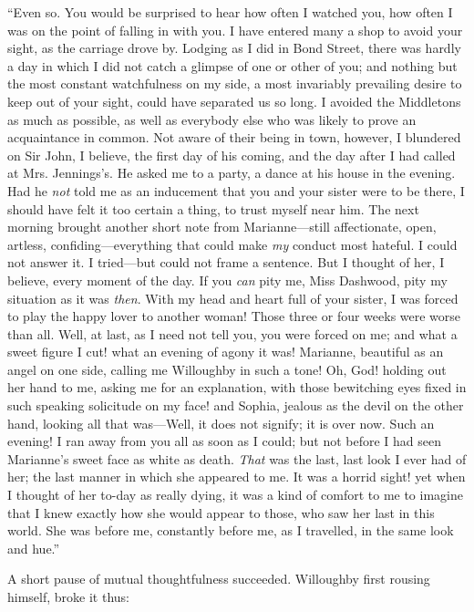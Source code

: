 
“Even so. You would be surprised to hear how often I watched you, how often I was on the point of falling in with you. I have entered many a shop to avoid your sight, as the carriage drove by. Lodging as I did in Bond Street, there was hardly a day in which I did not catch a glimpse of one or other of you; and nothing but the most constant watchfulness on my side, a most invariably prevailing desire to keep out of your sight, could have separated us so long. I avoided the Middletons as much as possible, as well as everybody else who was likely to prove an acquaintance in common. Not aware of their being in town, however, I blundered on Sir John, I believe, the first day of his coming, and the day after I had called at Mrs. Jennings's. He asked me to a party, a dance at his house in the evening. Had he {\em not} told me as an inducement that you and your sister were to be there, I should have felt it too certain a thing, to trust myself near him. The next morning brought another short note from Marianne---still affectionate, open, artless, confiding---everything that could make {\em my} conduct most hateful. I could not answer it. I tried---but could not frame a sentence. But I thought of her, I believe, every moment of the day. If you {\em can} pity me, Miss Dashwood, pity my situation as it was {\em then}. With my head and heart full of your sister, I was forced to play the happy lover to another woman! Those three or four weeks were worse than all. Well, at last, as I need not tell you, you were forced on me; and what a sweet figure I cut! what an evening of agony it was! Marianne, beautiful as an angel on one side, calling me Willoughby in such a tone! Oh, God! holding out her hand to me, asking me for an explanation, with those bewitching eyes fixed in such speaking solicitude on my face! and Sophia, jealous as the devil on the other hand, looking all that was---Well, it does not signify; it is over now. Such an evening! I ran away from you all as soon as I could; but not before I had seen Marianne's sweet face as white as death. {\em That} was the last, last look I ever had of her; the last manner in which she appeared to me. It was a horrid sight! yet when I thought of her to-day as really dying, it was a kind of comfort to me to imagine that I knew exactly how she would appear to those, who saw her last in this world. She was before me, constantly before me, as I travelled, in the same look and hue.”

A short pause of mutual thoughtfulness succeeded. Willoughby first rousing himself, broke it thus:

